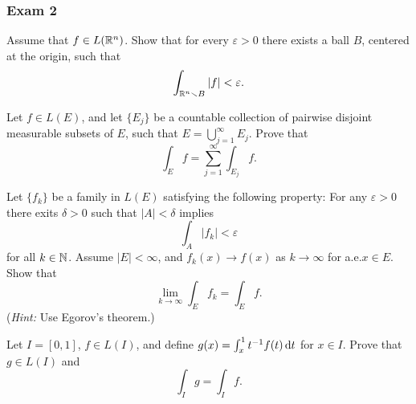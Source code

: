 \subsubsection{Exam 2}
\setcounter{exercise}{0}
\setcounter{equation}{0}

\begin{problem}
  Assume that \(f\in L(\mathbb{R}^n)\). Show that for every \(\varepsilon>0\)
  there exists a ball \(B\), centered at the origin, such that
  \[
    \int_{\mathbb{R}^n\smallsetminus B}|f|<\varepsilon.
  \]
\end{problem}
\begin{solution}
\end{solution}

\begin{problem}
  Let \(f\in L(E)\), and let \(\{E_j\}\) be a countable collection of
  pairwise disjoint measurable subsets of \(E\), such that
  \(E=\bigcup_{j=1}^\infty E_j\). Prove that
  \[
    \int_E f=\sum_{j=1}^\infty\int_{E_j}f.
  \]
\end{problem}
\begin{solution}
\end{solution}

\begin{problem}
  Let \(\{f_k\}\) be a family in \(L(E)\) satisfying the following
  property: For any \(\varepsilon>0\) there exits \(\delta>0\) such that
  \(|A|<\delta\) implies
  \[
    \int_A |f_k|<\varepsilon
  \]
  for all \(k\in\mathbb{N}\). Assume \(|E|<\infty\), and \(f_k(x)\to f(x)\) as
  \(k\to\infty\) for a.e.\@ \(x\in E\). Show that
  \[
    \lim_{k\to\infty}\int_E f_k=\int_E f.
  \]
  (\emph{Hint:} Use Egorov's theorem.)
\end{problem}
\begin{solution}
\end{solution}

\begin{problem}
  Let \(I=[0,1]\), \(f\in L(I)\), and define
  \(g(x)=\int_x^1 t^{-1}f(t) \mathop{}\!\mathrm{d} t\) for \(x\in I\). Prove that
  \(g\in L(I)\) and
  \[
    \int_I g=\int_I f.
  \]
\end{problem}
\begin{solution}
\end{solution}

